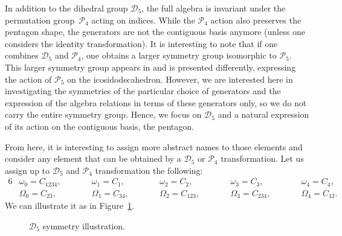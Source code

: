 \documentclass[pdftex]{sigma}
\numberwithin{equation}{section}
\begin{document}
In addition to the dihedral group $\mathcal{D}_5$, the full algebra is invariant under the permutation group~$\mathcal{P}_4$ acting on indices. While the $\mathcal{P}_4$ action also preserves the pentagon shape, the generators are not the contiguous basis anymore (unless one considers the identity transformation). It is interesting to note that if one combines $\mathcal{D}_5$ and $\mathcal{P}_4$, one obtains a larger symmetry group isomorphic to $\mathcal{P}_5$. This larger symmetry group appears in \cite{Crampe2023} and is presented differently, expressing the action of $\mathcal{P}_5$ on the icosidodecahedron. However, we are interested here in investigating the symmetries of the particular choice of generators and the expression of the algebra relations in terms of these generators only, so we do not carry the entire symmetry group. Hence, we focus on $\mathcal{D}_5$ and a natural expression of its action on the contiguous basis, the pentagon. %

From here, it is interesting to assign more abstract names to those elements and consider any element that can be obtained by a $\mathcal{D}_5$ or $\mathcal{P}_4$ transformation. Let us assign up to $\mathcal{D}_5$ and $\mathcal{P}_4$ transformation the following:
\begin{alignat*}{6}
&\omega_0=C_{1234},  \qquad&&\omega_1=C_1,\qquad&&\omega_2=C_2,\qquad&&\omega_3=C_3,\qquad&&\omega_4=C_4,&\\
& \Omega_0=C_{23}, \qquad&&
  \Omega_1=C_{34}, \qquad&&
  \Omega_2=C_{123}, \qquad&&
  \Omega_3=C_{234}, \qquad&&
  \Omega_4=C_{12}.&
\end{alignat*}
We can illustrate it as in Figure~\ref{fig:pentagon}.

\begin{figure}[t]
\centering
{}
\caption{$\mathcal{D}_5$ symmetry illustration.}
\label{fig:pentagon}
\end{figure}
\end{document}
